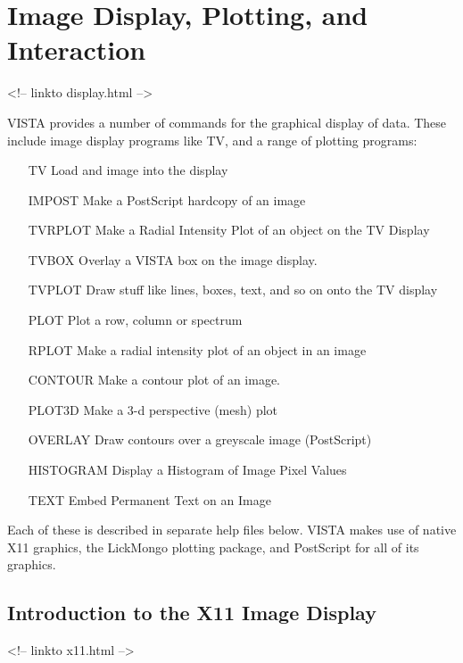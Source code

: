 \chapter{Image Display, Plotting, and Interaction}
\begin{rawhtml}
<!-- linkto display.html -->
\end{rawhtml}

%
%
%

VISTA provides a number of commands for the graphical display of data.
These include image display programs like TV, and a range of plotting
programs:
\begin{itemize} 
  \item[TV\hfill]{Load and image into the display}
  \item[IMPOST\hfill]{Make a PostScript hardcopy of an image}
  \item[TVRPLOT\hfill]{Make a Radial Intensity Plot of an object on the 
       TV Display}
  \item[TVBOX\hfill]{Overlay a VISTA box on the image display.}
  \item[TVPLOT \hfill]{Draw stuff like lines, boxes, text, and so on onto the 
       TV display}
  \item[PLOT\hfill]{Plot a row, column or spectrum}
  \item[RPLOT\hfill]{Make a radial intensity plot of an object in an image}
  \item[CONTOUR\hfill]{Make a contour plot of an image.}
  \item[PLOT3D\hfill]{Make a 3-d perspective (mesh) plot}
  \item[OVERLAY\hfill]{Draw contours over a greyscale image (PostScript)}
  \item[HISTOGRAM\hfill]{Display a Histogram of Image Pixel Values}
  \item[TEXT\hfill]{Embed Permanent Text on an Image}
\end{itemize} 
Each of these is described in separate help files below.  VISTA makes use
of native X11 graphics, the LickMongo plotting package, and PostScript for
all of its graphics.

\section{Introduction to the X11 Image Display}
\begin{rawhtml}
<!-- linkto x11.html -->
\end{rawhtml}

